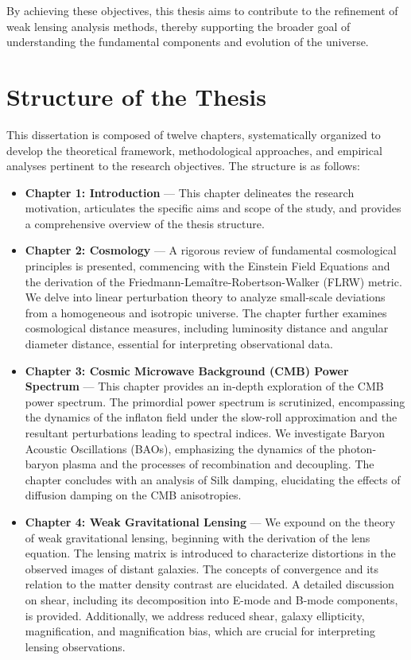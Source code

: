 By achieving these objectives, this thesis aims to contribute to the refinement of weak lensing analysis methods, thereby supporting the broader goal of understanding the fundamental components and evolution of the universe.

\section{Structure of the Thesis}

This dissertation is composed of twelve chapters, systematically organized to develop the theoretical framework, methodological approaches, and empirical analyses pertinent to the research objectives. The structure is as follows:

\begin{itemize}
    \item \textbf{Chapter 1: Introduction} --- This chapter delineates the research motivation, articulates the specific aims and scope of the study, and provides a comprehensive overview of the thesis structure.

    \item \textbf{Chapter 2: Cosmology} --- A rigorous review of fundamental cosmological principles is presented, commencing with the Einstein Field Equations and the derivation of the Friedmann-Lemaître-Robertson-Walker (FLRW) metric. We delve into linear perturbation theory to analyze small-scale deviations from a homogeneous and isotropic universe. The chapter further examines cosmological distance measures, including luminosity distance and angular diameter distance, essential for interpreting observational data.

    \item \textbf{Chapter 3: Cosmic Microwave Background (CMB) Power Spectrum} --- This chapter provides an in-depth exploration of the CMB power spectrum. The primordial power spectrum is scrutinized, encompassing the dynamics of the inflaton field under the slow-roll approximation and the resultant perturbations leading to spectral indices. We investigate Baryon Acoustic Oscillations (BAOs), emphasizing the dynamics of the photon-baryon plasma and the processes of recombination and decoupling. The chapter concludes with an analysis of Silk damping, elucidating the effects of diffusion damping on the CMB anisotropies.

    \item \textbf{Chapter 4: Weak Gravitational Lensing} --- We expound on the theory of weak gravitational lensing, beginning with the derivation of the lens equation. The lensing matrix is introduced to characterize distortions in the observed images of distant galaxies. The concepts of convergence and its relation to the matter density contrast are elucidated. A detailed discussion on shear, including its decomposition into E-mode and B-mode components, is provided. Additionally, we address reduced shear, galaxy ellipticity, magnification, and magnification bias, which are crucial for interpreting lensing observations.


\end{itemize}
